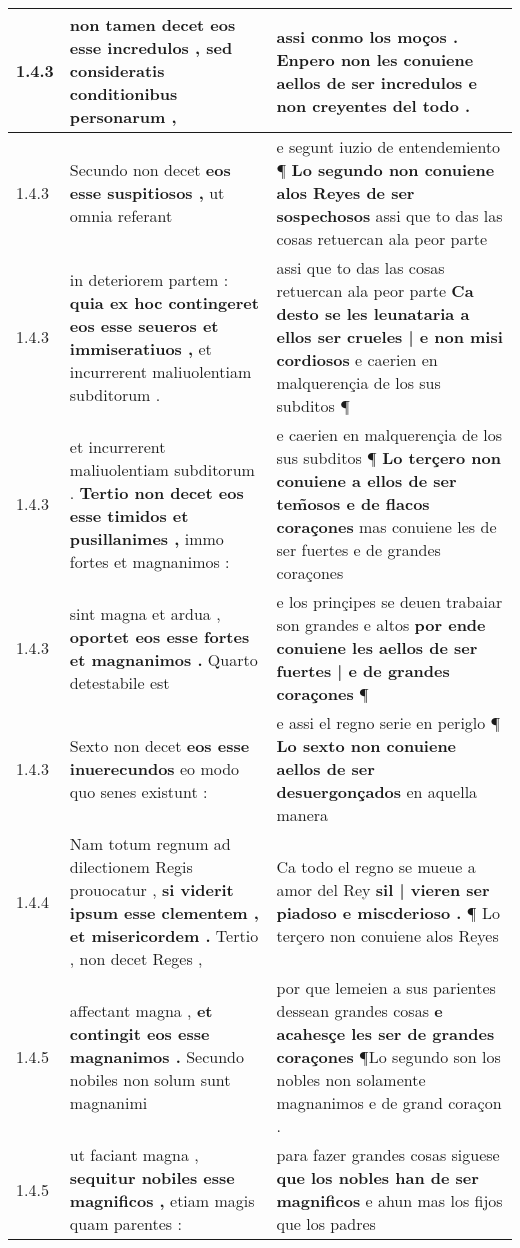 \begin{tabular}{|p{1cm}|p{6.5cm}|p{6.5cm}|}
1.4.3 & non tamen decet \textbf{ eos esse incredulos , } sed consideratis conditionibus personarum , & assi conmo los moços . \textbf{ Enpero non les conuiene aellos de ser incredulos } e non creyentes del todo . \\\hline
1.4.3 & Secundo non decet \textbf{ eos esse suspitiosos , } ut omnia referant & e segunt iuzio de entendemiento ¶ \textbf{ Lo segundo non conuiene alos Reyes de ser sospechosos } assi que to das las cosas retuercan ala peor parte \\\hline
1.4.3 & in deteriorem partem : \textbf{ quia ex hoc contingeret eos esse seueros et immiseratiuos , } et incurrerent maliuolentiam subditorum . & assi que to das las cosas retuercan ala peor parte \textbf{ Ca desto se les leunataria a ellos ser crueles | e non misi cordiosos } e caerien en malquerençia de los sus subditos ¶ \\\hline
1.4.3 & et incurrerent maliuolentiam subditorum . \textbf{ Tertio non decet eos esse timidos et pusillanimes , } immo fortes et magnanimos : & e caerien en malquerençia de los sus subditos ¶ \textbf{ Lo terçero non conuiene a ellos de ser tem̃osos e de flacos coraçones } mas conuiene les de ser fuertes e de grandes coraçones \\\hline
1.4.3 & sint magna et ardua , \textbf{ oportet eos esse fortes et magnanimos . } Quarto detestabile est & e los prinçipes se deuen trabaiar son grandes e altos \textbf{ por ende conuiene les aellos de ser fuertes | e de grandes coraçones } ¶ \\\hline
1.4.3 & Sexto non decet \textbf{ eos esse inuerecundos } eo modo quo senes existunt : & e assi el regno serie en periglo ¶ \textbf{ Lo sexto non conuiene aellos de ser desuergonçados } en aquella manera \\\hline
1.4.4 & Nam totum regnum ad dilectionem Regis prouocatur , \textbf{ si viderit ipsum esse clementem , et misericordem . } Tertio , non decet Reges , & Ca todo el regno se mueue a amor del Rey \textbf{ sil | vieren ser piadoso e miscderioso . } ¶ Lo terçero non conuiene alos Reyes \\\hline
1.4.5 & affectant magna , \textbf{ et contingit eos esse magnanimos . } Secundo nobiles non solum sunt magnanimi & por que lemeien a sus parientes dessean grandes cosas \textbf{ e acahesçe les ser de grandes coraçones } ¶Lo segundo son los nobles non solamente magnanimos e de grand coraçon . \\\hline
1.4.5 & ut faciant magna , \textbf{ sequitur nobiles esse magnificos , } etiam magis quam parentes : & para fazer grandes cosas siguese \textbf{ que los nobles han de ser magnificos } e ahun mas los fijos que los padres \\\hline

\end{tabular}
